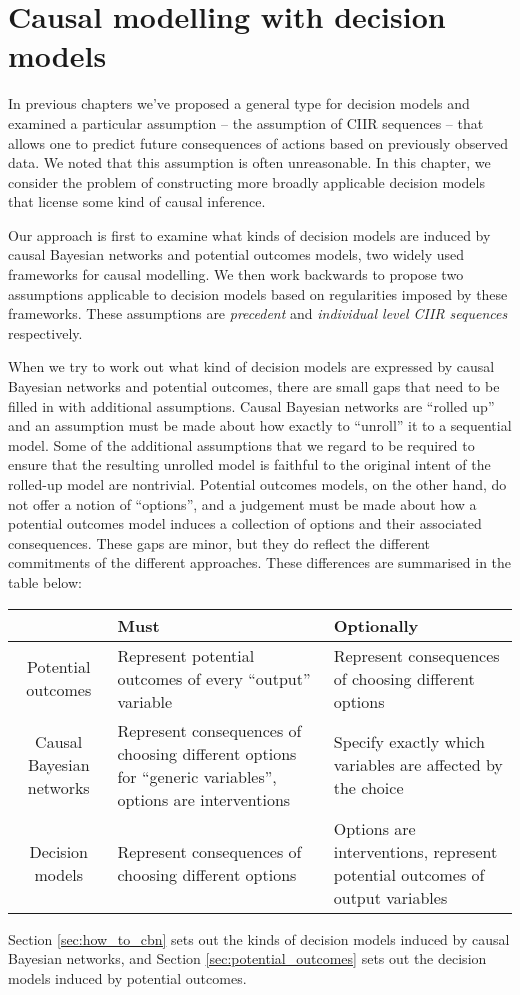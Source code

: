 
\chapter{Causal modelling with decision models}\label{ch:other_causal_frameworks}

In previous chapters we've proposed a general type for decision models and examined a particular assumption -- the assumption of CIIR sequences -- that allows one to predict future consequences of actions based on previously observed data. We noted that this assumption is often unreasonable. In this chapter, we consider the problem of constructing more broadly applicable decision models that license some kind of causal inference. 

Our approach is first to examine what kinds of decision models are induced by causal Bayesian networks and potential outcomes models, two widely used frameworks for causal modelling. We then work backwards to propose two assumptions applicable to decision models based on regularities imposed by these frameworks. These assumptions are \emph{precedent} and \emph{individual level CIIR sequences} respectively.

When we try to work out what kind of decision models are expressed by causal Bayesian networks and potential outcomes, there are small gaps that need to be filled in with additional assumptions. Causal Bayesian networks are ``rolled up'' and an assumption must be made about how exactly to ``unroll'' it to a sequential model. Some of the additional assumptions that we regard to be required to ensure that the resulting unrolled model is faithful to the original intent of the rolled-up model are nontrivial. Potential outcomes models, on the other hand, do not offer a notion of ``options'', and a judgement must be made about how a potential outcomes model induces a collection of options and their associated consequences. These gaps are minor, but they do reflect the different commitments of the different approaches. These differences are summarised in the table below:
\begin{center}
\begin{tabular}{ |c|p{4cm}|p{4cm}| } 
 \hline
  & Must & Optionally  \\
 \hline
 Potential outcomes & Represent potential outcomes of every ``output'' variable & Represent consequences of choosing different options \\ 
 Causal Bayesian networks & Represent consequences of choosing different options for ``generic variables'', options are interventions & Specify exactly which variables are affected by the choice \\
 Decision models & Represent consequences of choosing different options & Options are interventions, represent potential outcomes of output variables\\
 \hline
\end{tabular}
\end{center}
Section \ref{sec:how_to_cbn} sets out the kinds of decision models induced by causal Bayesian networks, and Section \ref{sec:potential_outcomes} sets out the decision models induced by potential outcomes.

